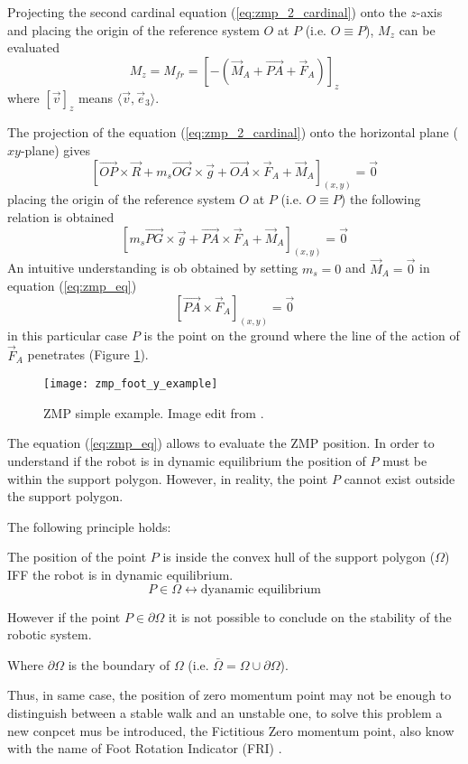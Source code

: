 Projecting the second cardinal equation (\ref{eq:zmp_2_cardinal}) onto the $z$-axis and placing the
origin of the reference system $O$ at $P$ (i.e. $O \equiv P$), $M_z$ can be evaluated
\[
M_z = M_{fr} = [-(\vec{M}_A + \vec{PA} + \vec{F}_A)]_z
\]
where $[\vec{v}]_z$ means $\langle \vec{v},\vec{e}_3 \rangle$.
\par
The projection of the equation (\ref{eq:zmp_2_cardinal}) onto the horizontal plane ($xy$-plane) gives
\[
\left[\vec{OP} \times \vec{R} + m_s \vec{OG} \times \vec{g} + \vec{OA} \times \vec{F}_A + \vec{M}_A\right]_{(x,y)} = \vec{0}
\]
placing the origin of the reference system $O$ at $P$ (i.e. $O \equiv P$) the following relation is
obtained
\begin{equation}
  \label{eq:zmp_eq}
  \left[ m_s \vec{PG} \times \vec{g} + \vec{PA} \times \vec{F}_A + \vec{M}_A\right]_{(x,y)} = \vec{0}
\end{equation}
An intuitive understanding is ob obtained by setting $m_s = 0$ and $\vec{M}_A = \vec{0}$ in equation
(\ref{eq:zmp_eq})
\[
\left[\vec{PA} \times \vec{F}_A\right]_{(x,y)} = \vec{0}
\]
in this particular case $P$ is the point on the ground where the line of the action of $\vec{F}_A$
penetrates (Figure \ref{fig:zmp_foot_y_example}).
\begin{figure}[!ht]
  \centering
  \texttt{[image: zmp\_foot\_y\_example]}
  \caption{ZMP simple example. Image edit from \cite{Vukobratov2004}. \label{fig:zmp_foot_y_example}}
\end{figure}
The equation (\ref{eq:zmp_eq}) allows to evaluate the ZMP position. In order to understand if the robot
is in dynamic equilibrium the position of $P$ must be within the support polygon. However, in reality, the
point $P$ cannot exist outside the support polygon.
\par
The following principle holds:
\begin{principle}
  The position of the point $P$ is inside the convex hull of the support polygon ($\Omega$)
  IFF the robot is in dynamic equilibrium.
  \[
  P \in \Omega \longleftrightarrow \text{dyanamic equilibrium}
  \]
  \par
  However if the point $P \in \partial \Omega$ it is not possible to conclude on the stability of the robotic system.
  \par
  Where $\partial \Omega$ is the boundary of $\Omega$ (i.e. $\bar{\Omega} = \Omega \cup \partial \Omega$).
\end{principle}
Thus, in same case, the position of zero momentum point may not be enough to distinguish between a
stable walk and an unstable one, to solve this problem a new conpcet mus be introduced, the
Fictitious Zero momentum point, also know with the name of Foot Rotation Indicator (FRI)
\cite{Goswami1999}.
\newpage
